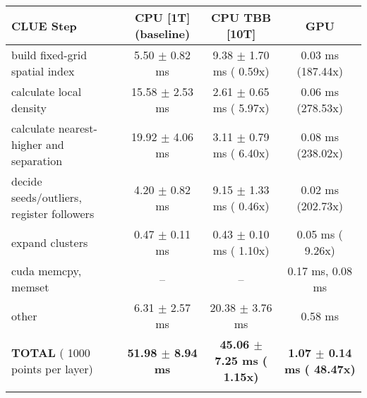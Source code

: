     \begin{tabular}{l|c|c|c}
    \hline
    CLUE Step                                 & CPU [1T] (baseline)         & CPU TBB [10T]                         & GPU                       \\ \hline
    build fixed-grid spatial index            &   5.50 $\pm$  0.82 ms       &   9.38 $\pm$  1.70 ms ( 0.59x)        &   0.03 ms (187.44x)       \\
    calculate local density                   &  15.58 $\pm$  2.53 ms       &   2.61 $\pm$  0.65 ms ( 5.97x)        &   0.06 ms (278.53x)       \\
    calculate nearest-higher and separation   &  19.92 $\pm$  4.06 ms       &   3.11 $\pm$  0.79 ms ( 6.40x)        &   0.08 ms (238.02x)       \\
    decide seeds/outliers, register followers &   4.20 $\pm$  0.82 ms       &   9.15 $\pm$  1.33 ms ( 0.46x)        &   0.02 ms (202.73x)       \\
    expand clusters                           &   0.47 $\pm$  0.11 ms       &   0.43 $\pm$  0.10 ms ( 1.10x)        &   0.05 ms (  9.26x)       \\ \hline
    cuda memcpy, memset                       & --                          & --                                    &   0.17 ms,   0.08 ms      \\ 
    other                                     &   6.31 $\pm$  2.57 ms       &  20.38 $\pm$  3.76 ms                 &   0.58 ms                 \\ \hline
    \textbf{TOTAL} ( 1000 points per layer)   & \textbf{ 51.98 $\pm$  8.94 ms} & \textbf{ 45.06 $\pm$  7.25 ms ( 1.15x)} & \textbf{  1.07 $\pm$  0.14 ms ( 48.47x)}  \\
    \hline
    \multicolumn{4}{c}{} 
    \end{tabular}
    \linebreak


